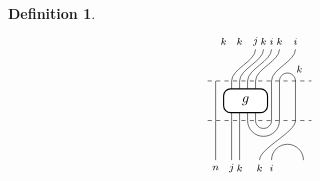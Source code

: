 \documentclass[11pt]{article}
\theoremstyle{plain}
\theoremstyle{definition}
\newtheorem{defn}[thm]{Definition}
\newcommand{\TLPlusPIso}[3]{
 \TLTStart
 \TLTThrough{#1}
 \TLTSnakeR{#2}{#3}
 \TLTEnd
}
\newcommand{\TLTCalcLabelOffset}[3][0cm]{
 \settowidth{#2}{\scriptsize{$#3$}}
 \setlength{#2}{.5#2}
 \setlength{#2}{\maxof{#2}{#1}}
}
\newcommand{\TLTEnd}{
 \draw[thick, rounded corners = 5pt] (0,0) rectangle ($ (TLTlead) + (0,.8) $);
 \end{tikzpicture}
}
\newcommand{\TLTStart}{
 \begin{tikzpicture}[baseline=.3cm]
 \coordinate (TLTlead) at (.2,0); %
 \let\TLTlabelwidth\relax
 \newlength{\TLTlabelwidth}
}
\newcommand{\TLTThrough}[1]{
 \TLTCalcLabelOffset[.2cm]{\TLTlabelwidth}{#1}
 \coordinate (TLTlead) at ($ (TLTlead) + ({\TLTlabelwidth},0) $);
 \begin{scope}[shift=(TLTlead)]
  \draw (0,0) -- (0,.8);
  \node at (0,1) {\scriptsize{$#1$}};
 \end{scope}
  \coordinate (TLTlead) at ($ (TLTlead) + ({\TLTlabelwidth},0) $);
}
\newcommand{\TLTSnakeR}[2]{
 \let\TLTscwidth\relax
 \newlength{\TLTscwidth}
 \let\TLTsswidth\relax
 \newlength{\TLTsswidth}
 \TLTCalcLabelOffset[.2cm]{\TLTscwidth}{#1}
 \TLTCalcLabelOffset[.5cm]{\TLTsswidth}{#2}
 \setlength{\TLTlabelwidth}{\TLTscwidth+\TLTsswidth}
 \setlength{\TLTlabelwidth}{\maxof{\TLTlabelwidth}{.7cm}} %
 \coordinate (TLTlead) at ($ (TLTlead) + ({\TLTscwidth},0) $);
 \begin{scope}[shift=(TLTlead)]
  \draw (.1,.8) arc (-180:0:.2cm);
  \draw (.1,0) .. controls ++(90:.3cm) and ++(270:.3cm) .. ($ (.1,.8) + ({\TLTlabelwidth},0) $);
  \draw ($ (.1,0) + ({\TLTsswidth},0) $) arc (180:0:.2cm);
  \node at (.1,1) {\scriptsize{$#1$}};
  \node at ($ (.1,1) + ({\TLTlabelwidth},0) $) {\scriptsize{$#2$}};
  \node at ($ (.1,-.2) + ({\TLTsswidth},0) $) {\scriptsize{$#1$}};
 \end{scope}
 \coordinate (TLTlead) at ($ (TLTlead) + ({\TLTlabelwidth+\TLTsswidth},0) $);
}
\begin{document}
\begin{defn}
\begin{align*}
\begin{tikzpicture}[baseline=.3cm]
\begin{scope}[shift={(0,1)}]
\begin{scope}[shift={(.1,0)}]
     \node at (.3,1) {\scriptsize{$k$}};
     \node at (.7,1) {\scriptsize{$k$}};
     \begin{scope}[shift={(.2,0)}] %
      \draw (.3,0)  .. controls ++(90:.3cm) and ++(270:.3cm) .. (.9,.8);
      \node at (.9,1) {\scriptsize{$j$}};
      \draw (.5,0)  .. controls ++(90:.3cm) and ++(270:.3cm) .. (1.1,.8);
      \node at (1.1,1) {\scriptsize{$k$}};
      \draw (.7,0)  .. controls ++(90:.3cm) and ++(270:.3cm) .. (1.3,.8);
      \node at (1.3,1) {\scriptsize{$i$}};
      \draw (.9,0)  .. controls ++(90:.3cm) and ++(270:.3cm) .. (1.5,.8);
      \node at (1.5,1) {\scriptsize{$k$}};
     \end{scope}
     \begin{scope}[shift={(.4,0)}] %
      \draw (1.1,0)  .. controls ++(90:.3cm) and ++(270:.3cm) .. (1.7,.8);
      \node at (1.7,1) {\scriptsize{$i$}};
      \draw (1.3,0) arc (180:0:.2cm);
      \node at (1.8,.3) {\scriptsize{$k$}};
     \end{scope}
    \end{scope}
    \draw[dashed] (0,0) -- (2.6,0);
   \end{scope}
   \draw (.2,0) -- (.2,1); %
   \draw (.6,0) -- (.6,1); %
   \draw (.8,0) -- (.8,1);
   \draw (1,0) -- (1,1);
   \draw (1.2,0) -- (1.2,1);
   \draw[thick, rounded corners = 5pt, fill=white] (.4,.2) rectangle (1.5,.8);
   \node at (.95,.5) {$g$};
   \draw (1.6,0) -- (1.6,1); %
   \draw (1.8,0) -- (1.8,1);
   \draw (2.2,0) -- (2.2,1);
   \draw[dashed] (0,0) -- (2.6,0);
   \begin{scope}[shift={(0,-1)}]
    \begin{scope}[shift={(.1,0)}]
     \draw (.1,0) -- (.1,1);
     \node at (.1,-0.2) {\scriptsize{$n$}};
     \begin{scope}[shift={(.2,0)}] %
      \draw (.3,0) -- (.3,1);
      \node at (.3,-0.2) {\scriptsize{$j$}};
      \draw (.5,0) -- (.5,1);
      \node at (.5,-0.2) {\scriptsize{$k$}};
      \draw (.7,1) arc (-180:0:.4cm); %
      \draw (.9,1) arc (-180:0:.2cm); %
      \draw (1,0)  .. controls ++(90:.3cm) and ++(270:.3cm) .. (1.9,1);
      \node at (1,-0.2) {\scriptsize{$k$}};
      \draw (1.3,0) arc (180:0:.4cm);
      \node at (1.3,-0.2) {\scriptsize{$i$}};

\end{scope}
\end{scope}
\end{scope}
\end{tikzpicture}
\end{align*}
\end{defn}
\end{document}
